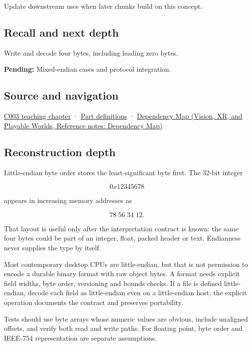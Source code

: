 \hypertarget{appendix-367b6abf460e-used-by}{}

Update downstream uses when later chunks build on this concept.

\subsection{Recall and next depth}\label{appendix-367b6abf460e-recall-and-next-depth}

\hypertarget{appendix-367b6abf460e-recall-and-next-depth}{}

Write and decode four bytes, including leading zero bytes.

\textbf{Pending:} Mixed-endian cases and protocol integration.

\subsection{Source and navigation}\label{appendix-367b6abf460e-source-and-navigation}

\hypertarget{appendix-367b6abf460e-source-and-navigation}{}

\hyperref[01-foundations-i-ch002-where-the-bytes-live]{C003 teaching chapter} · \hyperref[appendix-fd090d982a15-m003---parts-41-60]{Part definitions} · \href{../07-Vision-XR-and-Playable-Worlds/main.pdf\#nameddest=appendix-4ad47bdd269a}{Dependency Map (Vision, XR, and Playable Worlds, Reference notes: Dependency Map)}

\subsection{Reconstruction depth}\label{appendix-367b6abf460e-reconstruction-depth}

\hypertarget{appendix-367b6abf460e-reconstruction-depth}{}

Little-endian byte order stores the least-significant byte first. The 32-bit integer

\[
0x12345678
\]

appears in increasing memory addresses as

\[
78\;56\;34\;12.
\]

That layout is useful only after the interpretation contract is known: the same four bytes could be part of an integer, float, packed header or text. Endianness never supplies the type by itself.

Most contemporary desktop CPUs are little-endian, but that is not permission to encode a durable binary format with raw object bytes. A format needs explicit field widths, byte order, versioning and bounds checks. If a file is defined little-endian, decode each field as little-endian even on a little-endian host; the explicit operation documents the contract and preserves portability.

Tests should use byte arrays whose numeric values are obvious, include unaligned offsets, and verify both read and write paths. For floating point, byte order and IEEE-754 representation are separate assumptions.
